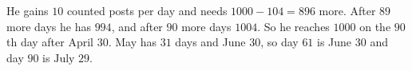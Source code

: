 He gains $10$ counted posts per day and needs $1000-104=896$ more. After $89$ more days he has $994$, and after $90$ more days $1004$. So he reaches $1000$ on the $90$th day after April $30$. May has $31$ days and June $30$, so day $61$ is June $30$ and day $90$ is $\boxed{\text{July }29}$.
